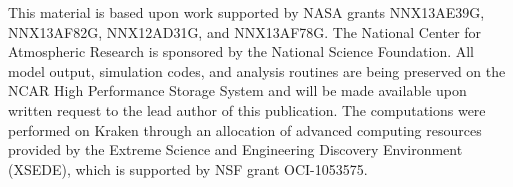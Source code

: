 \documentclass[draft,jgrga]{agutex}
\begin{document}
\begin{article}
\begin{acknowledgments}
This material is based upon work supported by NASA grants NNX13AE39G, NNX13AF82G, NNX12AD31G, and NNX13AF78G.  The National Center for Atmospheric Research is sponsored by the National Science Foundation.  All model output, simulation codes, and analysis routines are being preserved on the NCAR High Performance Storage System and will be made available upon written request to the lead author of this publication.  The computations were performed on Kraken through an allocation of advanced computing resources provided by the Extreme Science and Engineering Discovery Environment (XSEDE), which is supported by NSF grant OCI-1053575.
\end{acknowledgments}

%
%
%
%
%
%
%
%
%


%
%
%
%


\end{article}
\end{document}
